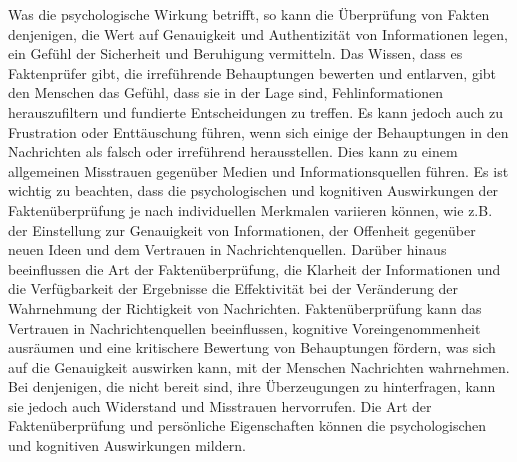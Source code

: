 \documentclass[a4paper,listof=totoc,bibliography=totoc]{scrartcl}
\begin{document}
Was die psychologische Wirkung betrifft, so kann die Überprüfung von Fakten denjenigen, die Wert auf Genauigkeit und Authentizität von Informationen 
legen, ein Gefühl der Sicherheit und Beruhigung vermitteln. Das Wissen, dass es Faktenprüfer gibt, die irreführende Behauptungen bewerten und entlarven, gibt den Menschen das Gefühl, 
dass sie in der Lage sind, Fehlinformationen herauszufiltern und fundierte Entscheidungen zu treffen. Es kann jedoch auch zu Frustration oder Enttäuschung führen, wenn sich einige 
der Behauptungen in den Nachrichten als falsch oder irreführend herausstellen. Dies kann zu einem allgemeinen Misstrauen gegenüber Medien und Informationsquellen führen. 
Es ist wichtig zu beachten, dass die psychologischen und kognitiven Auswirkungen der Faktenüberprüfung je nach individuellen Merkmalen variieren können, wie z.B. der 
Einstellung zur Genauigkeit von Informationen, der Offenheit gegenüber neuen Ideen und dem Vertrauen in Nachrichtenquellen. Darüber hinaus beeinflussen die Art der Faktenüberprüfung, 
die Klarheit der Informationen und die Verfügbarkeit der Ergebnisse die Effektivität bei der Veränderung der Wahrnehmung der Richtigkeit von Nachrichten. 
Faktenüberprüfung kann das Vertrauen in Nachrichtenquellen beeinflussen, kognitive Voreingenommenheit ausräumen und eine kritischere Bewertung von Behauptungen fördern, 
was sich auf die Genauigkeit auswirken kann, mit der Menschen Nachrichten wahrnehmen. Bei denjenigen, die nicht bereit sind, ihre Überzeugungen zu hinterfragen, kann sie 
jedoch auch Widerstand und Misstrauen hervorrufen. Die Art der Faktenüberprüfung und persönliche Eigenschaften können die psychologischen und kognitiven Auswirkungen mildern.
\end{document}
